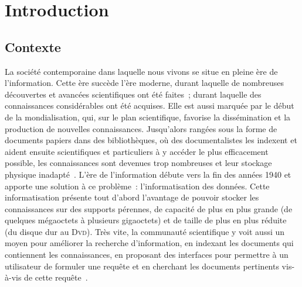 \chapter{Introduction}
\label{chap:main-introduction}


  \section{Contexte}
  \label{sec:main-introduction-context}
    La société contemporaine dans laquelle nous vivons se situe en pleine ère de
    l'information. Cette ère succède l'ère moderne, durant laquelle de
    nombreuses découvertes et avancées scientifiques ont été faites~; durant
    laquelle des connaissances considérables ont été acquises. Elle  est aussi
    marquée par le début de la mondialisation, qui, sur le plan scientifique,
    favorise la dissémination et la production de nouvelles connaissances.
    Jusqu'alors rangées sous la forme de documents papiers dans des
    bibliothèques, où des documentalistes les indexent et aident ensuite
    scientifiques et particuliers à y accéder le plus efficacement possible, les
    connaissances sont devenues trop nombreuses et leur stockage physique
    inadapté~\cite{rider1946thegreatdilemmaofworldorganization}. L'ère de
    l'information débute vers la fin des années 1940 et apporte une solution à
    ce problème~: l'informatisation des données. Cette informatisation présente
    tout d'abord l'avantage de pouvoir stocker les connaissances sur des
    supports pérennes, de capacité de plus en plus grande (de quelques
    mégaoctets à plusieurs gigaoctets) et de taille de plus en plus réduite (du
    disque dur au \textsc{Dvd}). Très vite, la communauté scientifique y voit
    aussi un moyen pour améliorer la recherche d'information, en indexant les
    documents qui contiennent les connaissances, en proposant des interfaces
    pour permettre à un utilisateur de formuler une requête et en cherchant les
    documents pertinents vis-à-vis de cette requête~\cite{salton1975tfidf}.

